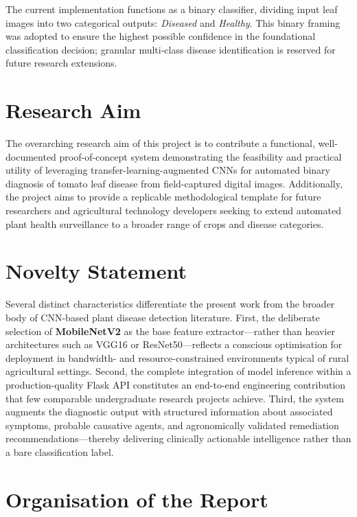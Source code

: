 \documentclass[12pt,a4paper]{report}
\begin{document}
The current implementation functions as a binary classifier, dividing input leaf images into two categorical outputs: \textit{Diseased} and \textit{Healthy}. This binary framing was adopted to ensure the highest possible confidence in the foundational classification decision; granular multi-class disease identification is reserved for future research extensions.

\section{Research Aim}

The overarching research aim of this project is to contribute a functional, well-documented proof-of-concept system demonstrating the feasibility and practical utility of leveraging transfer-learning-augmented CNNs for automated binary diagnosis of tomato leaf disease from field-captured digital images. Additionally, the project aims to provide a replicable methodological template for future researchers and agricultural technology developers seeking to extend automated plant health surveillance to a broader range of crops and disease categories.

\section{Novelty Statement}

Several distinct characteristics differentiate the present work from the broader body of CNN-based plant disease detection literature. First, the deliberate selection of \textbf{MobileNetV2} as the base feature extractor---rather than heavier architectures such as VGG16 or ResNet50---reflects a conscious optimisation for deployment in bandwidth- and resource-constrained environments typical of rural agricultural settings. Second, the complete integration of model inference within a production-quality Flask API constitutes an end-to-end engineering contribution that few comparable undergraduate research projects achieve. Third, the system augments the diagnostic output with structured information about associated symptoms, probable causative agents, and agronomically validated remediation recommendations---thereby delivering clinically actionable intelligence rather than a bare classification label.

\section{Organisation of the Report}
\end{document}
